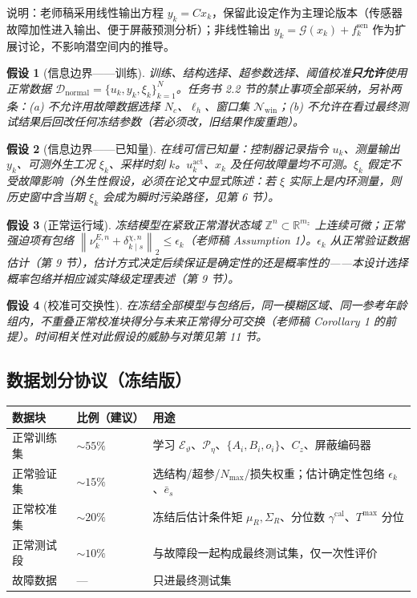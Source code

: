 \documentclass[11pt,a4paper]{ctexart}
\newtheorem{assumption}{假设}
\theoremstyle{remark}
\newcommand{\R}{\mathbb{R}}
\newcommand{\Zn}{\mathbb{Z}^{n}}
\newcommand{\norm}[1]{\left\|#1\right\|}
\newcommand{\Enc}{\mathcal{E}_{\vartheta}}
\newcommand{\Prem}{\mathcal{P}_{\eta}}
\begin{document}
说明：老师稿采用线性输出方程 $y_k=Cx_k$，保留此设定作为主理论版本（传感器故障加性进入输出、便于屏蔽预测分析）；非线性输出 $y_k=\mathcal G(x_k)+f^{\mathrm{sen}}_k$ 作为扩展讨论，不影响潜空间内的推导。

\begin{assumption}[信息边界——训练]\label{as:info-train}
训练、结构选择、超参数选择、阈值校准\textbf{只允许}使用正常数据 $\mathcal D_{\mathrm{normal}}=\{u_k,y_k,\xi_k\}_{k=1}^{N}$。任务书 2.2 节的禁止事项全部采纳，另补两条：(a) 不允许用故障数据选择 $N_c$、$\ell_h$、窗口集 $\mathcal N_{\mathrm{win}}$；(b) 不允许在看过最终测试结果后回改任何冻结参数（若必须改，旧结果作废重跑）。
\end{assumption}

\begin{assumption}[信息边界——已知量]\label{as:info-known}
在线可信已知量：控制器记录指令 $u_k$、测量输出 $y_k$、可测外生工况 $\xi_k$、采样时刻 $k$。$u^{\mathrm{act}}_k$、$x_k$ 及任何故障量均不可测。$\xi_k$ 假定不受故障影响（外生性假设，必须在论文中显式陈述：若 $\xi$ 实际上是内环测量，则历史窗中含当期 $\xi_k$ 会成为瞬时污染路径，见第 6 节）。
\end{assumption}

\begin{assumption}[正常运行域]\label{as:domain}
冻结模型在紧致正常潜状态域 $\Zn\subset\R^{m_z}$ 上连续可微；正常强迫项有包络 $\norm{\nu^{E,n}_k+\delta^{\chi,n}_{k\mid s}}_2\le\epsilon_k$（老师稿 Assumption 1）。$\epsilon_k$ 从正常验证数据估计（第 9 节），估计方式决定后续保证是确定性的还是概率性的——本设计选择概率包络并相应诚实降级定理表述（第 9 节）。
\end{assumption}

\begin{assumption}[校准可交换性]\label{as:exch}
在冻结全部模型与包络后，同一模糊区域、同一参考年龄组内，不重叠正常校准块得分与未来正常得分可交换（老师稿 Corollary 1 的前提）。时间相关性对此假设的威胁与对策见第 11 节。
\end{assumption}

\subsection{数据划分协议（冻结版）}

\begin{center}
\begin{tabular}{llp{}}
\toprule
数据块 & 比例（建议） & 用途 \\
\midrule
正常训练集 & $\sim55\%$ & 学习 $\Enc$、$\Prem$、$\{A_i,B_i,o_i\}$、$C_z$、屏蔽编码器 \\
正常验证集 & $\sim15\%$ & 选结构/超参/$N_{\max}$/损失权重；估计确定性包络 $\epsilon_k$、$\bar e_s$ \\
正常校准集 & $\sim20\%$ & 冻结后估计条件矩 $\mu_R,\Sigma_R$、分位数 $\gamma^{\mathrm{cal}}$、$T^{\max}$ 分位 \\
正常测试段 & $\sim10\%$ & 与故障段一起构成最终测试集，仅一次性评价 \\
故障数据 & --- & 只进最终测试集 \\
\bottomrule
\end{tabular}
\end{center}
\end{document}
